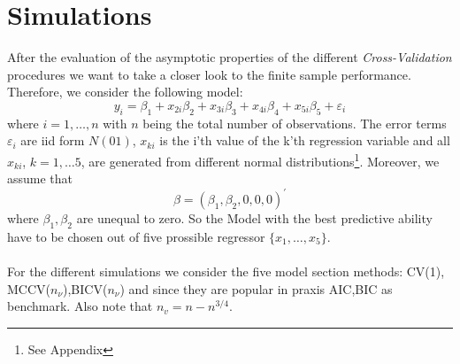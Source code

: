 \documentclass[Research_Module_ES.tex]{subfiles}
\begin{document}
\section{Simulations}
After the evaluation of the asymptotic properties of the different \textit{Cross-Validation} procedures we want to take a closer look to the finite sample performance. Therefore, we consider the following model:
\[
	y_i=\beta_1+x_{2i}\beta_2+x_{3i}\beta_3+x_{4i}\beta_4+x_{5i}\beta_5+\varepsilon_i
\]
where $i=1,\ldots,n$ with $n$ being the total number of observations. The error terms $\varepsilon_i$ are iid form $N(01)$,  $x_{ki}$ is the i'th value of the k'th regression variable and all $x_{ki}$, $k=1,\ldots5$, are generated from different normal distributions\footnote{See Appendix}. Moreover, we assume that
\[
	\beta=(\beta_1,\beta_2,0,0,0)^\prime
\]
where $\beta_1,\beta_2$ are unequal to zero. So the Model with the best predictive ability have to be chosen out of five prossible regressor $\{x_1,\ldots,x_5\}$. \\
\\
For the different simulations we consider the five model section methods: CV(1), MCCV($n_\nu$),BICV($n_\nu$) and since they are popular in praxis AIC,BIC as benchmark. Also note that $n_v=n-n^{3/4}$.
\end{document}
